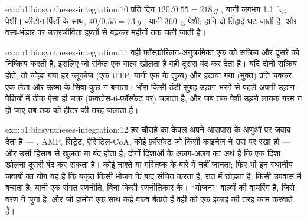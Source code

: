 \begin{solution}{exo:b1:biosyntheses-integration:10}
प्रति दिन $120/0.55 = \qty{218}{g}$ , यानी लगभग \qty{1.1}{kg}
पेशी। कीटोन-पिंडों के साथ, $40/0.55 = \qty{73}{g}$ , यानी
\qty{360}{g} पेशी: हानि दो-तिहाई घट जाती है, और वसा-भंडार पर उत्तरजीविता
हफ़्तों से बढ़कर महीनों तक चली जाती है।
\end{solution}

\begin{solution}{exo:b1:biosyntheses-integration:11}
वही फ़ॉस्फ़ोरिलन-अनुक्रमिका एक को सक्रिय और दूसरे को निष्क्रिय करती है,
इसलिए जो संकेत एक वाल्व खोलता है वही दूसरा बंद कर देता है। यदि दोनों
सक्रिय होते, तो जोड़ा गया हर ग्लूकोज (एक UTP, यानी एक  के तुल्य) और
हटाया गया (मुक्त) प्रति चक्कर एक  लेता और ऊष्मा के सिवा कुछ न बनाता।
भौंरा किसी ठंडी सुबह उड़ान भरने से पहले अपनी उड़ान-पेशियों में ठीक ऐसा ही
चक्र (फ्रक्टोस-6-फ़ॉस्फ़ेट पर) चलाता है, और जब तक पेशी उड़ने लायक गरम न हो
जाए तब तक  को हीटर की तरह जलाता है।
\end{solution}

\begin{solution}{exo:b1:biosyntheses-integration:12}
हर चौराहे का  केवल अपने आसपास के अणुओं पर जवाब देता है ---
, AMP, सिट्रेट, ऐसिटिल-CoA, कोई फ़ॉस्फ़ेट जो किसी काइनेज़ ने उस पर रखा
हो --- और उसी हिसाब से खुलता या बंद होता है; दोनों दिशाओं के अलग-अलग
 का अर्थ है कि एक दिशा खोलना दूसरी बंद कर सकता है। कोई
 नाश्ते या मस्तिष्क के बारे में नहीं जानता; फिर भी इन स्थानीय
जवाबों का योग यह है कि यकृत किसी भोजन के बाद संचित करता है, रात में
छोड़ता है, किसी उपवास में  बचाता है: यानी एक संगत रणनीति, बिना
किसी रणनीतिकार के। ``योजना'' वाल्वों की वायरिंग है, जिसे वरण ने चुना है,
और जो हार्मोन एक साथ कई वाल्व बैठाते हैं वही  को एक इकाई की तरह काम
करवाते हैं।
\end{solution}

